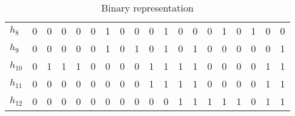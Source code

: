 \begin{table}[h!]
\begin{subtable}[h]{0.9\textwidth}
\begin{tabular}{l|cccc cccc cccc cccc|cc}
				$h_8$ & 0  & 0 & 0  & 0  & 0 & 1 & 0 & 0  & 0 & 1	 & 0 & 0  & 0 & 1  & 0 & 1 & 0 & 0\\
				$h_9$ & 0  & 0 & 0  & 0  & 0 & 1 & 0 & 1  & 0 & 1	 & 0 & 1  & 0 & 0  & 0 & 0 & 0 & 1\\
				$h_{10}$ & 0  & 1 & 1  & 1  & 0 & 0 & 0 & 0  & 1 & 1 & 1 & 1  & 0 & 0  & 0 & 0 & 1 & 1\\
				$h_{11}$ & 0  & 0 & 0  & 0  & 0 & 0 & 0 & 0  & 1 & 1 & 1 & 1  & 0 & 0  & 0 & 0 & 1 & 1\\
				$h_{12}$ & 0  & 0 & 0  & 0  & 0 & 0 & 0 & 0  & 0 & 0 & 1 & 1  & 1 & 1  & 1 & 0 & 1 & 1\\
				\bottomrule
			\end{tabular}
	\end{subtable}
	\caption{Binary representation}
\end{table}


